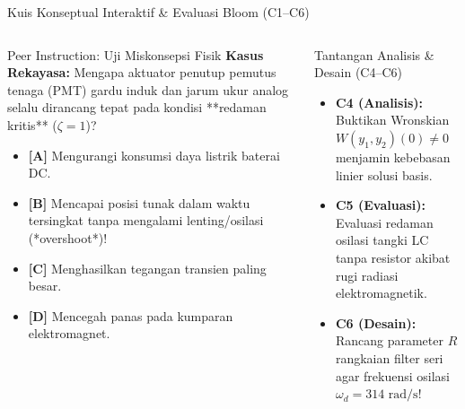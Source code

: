 \documentclass[aspectratio=169,10pt]{beamer}
\begin{document}
\begin{frame}{Kuis Konseptual Interaktif \& Evaluasi Bloom (C1--C6)}
  \begin{columns}[t]
    \begin{alertblock}{Peer Instruction: Uji Miskonsepsi Fisik}
      \footnotesize
      \textbf{Kasus Rekayasa:} Mengapa aktuator penutup pemutus tenaga (PMT) gardu induk dan jarum ukur analog selalu dirancang tepat pada kondisi **redaman kritis** ($\zeta = 1$)?
      \vspace{0.05cm}
      \begin{itemize}\setlength{\itemsep}{1pt}
        \item \textbf{[A]} Mengurangi konsumsi daya listrik baterai DC.
        \item \textbf{[B]} Mencapai posisi tunak dalam waktu tersingkat tanpa mengalami lenting/osilasi (*overshoot*)!
        \item \textbf{[C]} Menghasilkan tegangan transien paling besar.
        \item \textbf{[D]} Mencegah panas pada kumparan elektromagnet.
      \end{itemize}
    \end{alertblock}

    \begin{block}{Tantangan Analisis \& Desain (C4--C6)}
      \footnotesize
      \begin{itemize}\setlength{\itemsep}{2pt}
        \item \textbf{C4 (Analisis):} Buktikan Wronskian $W(y_1, y_2)(0) \ne 0$ menjamin kebebasan linier solusi basis.
        \item \textbf{C5 (Evaluasi):} Evaluasi redaman osilasi tangki LC tanpa resistor akibat rugi radiasi elektromagnetik.
        \item \textbf{C6 (Desain):} Rancang parameter $R$ rangkaian filter seri agar frekuensi osilasi $\omega_d = 314\text{ rad/s}$!
      \end{itemize}
    \end{block}
  \end{columns}
\end{frame}
\end{document}
